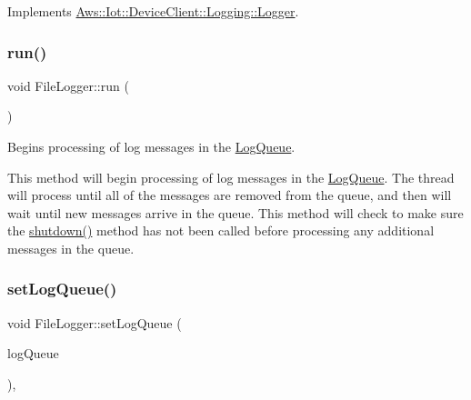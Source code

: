 Implements \hyperlink{class_aws_1_1_iot_1_1_device_client_1_1_logging_1_1_logger_a75acdae576e13ddd84bccb70d8fb1fef}{Aws\+::\+Iot\+::\+Device\+Client\+::\+Logging\+::\+Logger}.

\mbox{\label{class_aws_1_1_iot_1_1_device_client_1_1_logging_1_1_file_logger_a3c6b08640df02c4065c358523dc6a37d}} 
\subsubsection{\texorpdfstring{run()}{run()}}
{\footnotesize\ttfamily void File\+Logger\+::run (\begin{DoxyParamCaption}{ }\end{DoxyParamCaption})\hspace{0.3cm}{\ttfamily [private]}}



Begins processing of log messages in the \hyperlink{class_aws_1_1_iot_1_1_device_client_1_1_logging_1_1_log_queue}{Log\+Queue}. 

This method will begin processing of log messages in the \hyperlink{class_aws_1_1_iot_1_1_device_client_1_1_logging_1_1_log_queue}{Log\+Queue}. The thread will process until all of the messages are removed from the queue, and then will wait until new messages arrive in the queue. This method will check to make sure the \hyperlink{class_aws_1_1_iot_1_1_device_client_1_1_logging_1_1_file_logger_a7cbd7f8942bc9da32a9ff385128d5519}{shutdown()} method has not been called before processing any additional messages in the queue. \mbox{\label{class_aws_1_1_iot_1_1_device_client_1_1_logging_1_1_file_logger_a42b047d2f2379638add126414690d65d}} 
\subsubsection{\texorpdfstring{set\+Log\+Queue()}{setLogQueue()}}
{\footnotesize\ttfamily void File\+Logger\+::set\+Log\+Queue (\begin{DoxyParamCaption}\item[{std\+::unique\+\_\+ptr$<$ \hyperlink{class_aws_1_1_iot_1_1_device_client_1_1_logging_1_1_log_queue}{Log\+Queue} $>$}]{log\+Queue }\end{DoxyParamCaption})\hspace{0.3cm}{\ttfamily [override]}, {\ttfamily [virtual]}}



